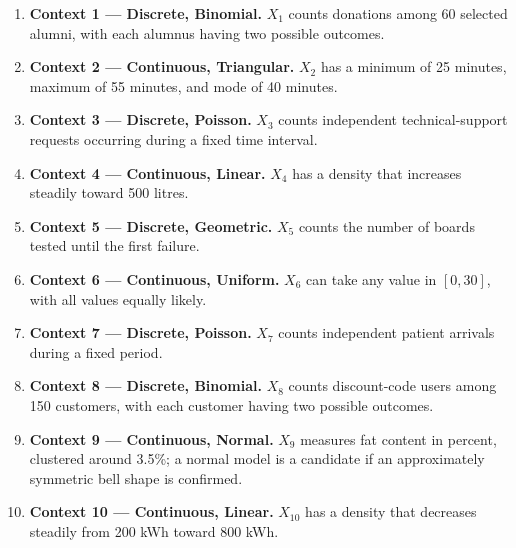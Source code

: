 {		\begin{enumerate}
			
			\item \textbf{Context 1 — Discrete, Binomial.}
			\(X_1\) counts donations among 60 selected alumni, with each alumnus
			having two possible outcomes.
			
			\item \textbf{Context 2 — Continuous, Triangular.}
			\(X_2\) has a minimum of 25 minutes, maximum of 55 minutes, and
			mode of 40 minutes.
			
			\item \textbf{Context 3 — Discrete, Poisson.}
			\(X_3\) counts independent technical-support requests occurring
			during a fixed time interval.
			
			\item \textbf{Context 4 — Continuous, Linear.}
			\(X_4\) has a density that increases steadily toward 500 litres.
			
			\item \textbf{Context 5 — Discrete, Geometric.}
			\(X_5\) counts the number of boards tested until the first failure.
			
			\item \textbf{Context 6 — Continuous, Uniform.}
			\(X_6\) can take any value in \([0,30]\), with all values equally likely.
			
			\item \textbf{Context 7 — Discrete, Poisson.}
			\(X_7\) counts independent patient arrivals during a fixed period.
			
			\item \textbf{Context 8 — Discrete, Binomial.}
			\(X_8\) counts discount-code users among 150 customers, with each
			customer having two possible outcomes.
			
			\item \textbf{Context 9 — Continuous, Normal.}
			\(X_9\) measures fat content in percent, clustered around 3.5\%;
            a normal model is a candidate if an approximately symmetric bell shape is confirmed.
			
			\item \textbf{Context 10 — Continuous, Linear.}
			\(X_{10}\) has a density that decreases steadily from 200 kWh
			toward 800 kWh.
			
		\end{enumerate}
		
		\vspace{-5mm}
		
	}
	
